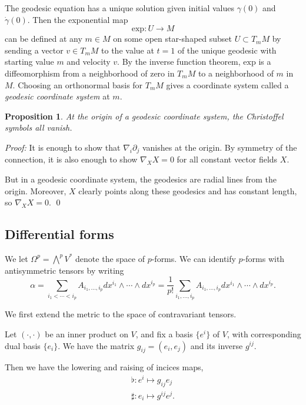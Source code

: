 \documentclass[12pt, reqno]{extarticle}
\theoremstyle{plain}
\newtheorem{proposition}{Proposition}[section]
\theoremstyle{definition}
\theoremstyle{remark}
\begin{document}
The geodesic equation has a unique solution given initial values $\gamma(0)$ and $\dot{\gamma}(0)$.
Then the exponential map 
\[
    \text{exp}: U \to M
\]
can be defined at any $m \in M$ on some open star-shaped subset $U \subset T_m M$ by 
sending a vector $v \in T_m M$ to the value at $t = 1$ of the unique geodesic 
with starting value $m$ and velocity $v$. By the inverse function theorem, $\text{exp}$
is a diffeomorphism from a neighborhood of zero in $T_m M$ to a neighborhood of $m$ in $M$.
Choosing an orthonormal basis for $T_m M$ gives a coordinate system called
a \textit{geodesic coordinate system} at $m$. 

\begin{proposition}
    At the origin of a geodesic coordinate system, the Christoffel symbols all vanish.
\end{proposition}

\textit{Proof:} It is enough to show that $\nabla_i \partial_j$ vanishes at the origin. 
By symmetry of the connection, it is also enough to show $\nabla_X X = 0$ for
all constant vector fields $X$.

But in a geodesic coordinate system, the geodesics are radial lines from the origin. Moreover,
$X$ clearly points along these geodesics and has constant length, so $\nabla_X X = 0$. \qed

\subsection{Differential forms}

We let $\Omega^p = \bigwedge^p V^*$ denote the space of $p$-forms. We can identify 
$p$-forms with antisymmetric tensors by writing 
\[
    \alpha = \sum_{i_1 < \cdots < i_p} A_{i_1, \dots, i_p} dx^{i_1}\wedge \cdots \wedge dx^{i_p}
    = \frac{1}{p!}\sum_{i_1,\dots, i_p} A_{i_1,\dots, i_p} dx^{i_1}\wedge \cdots \wedge dx^{i_p}.
\]

We first extend the metric to the space of contravariant tensors. 

Let $(\cdot, \cdot)$ be an inner product on $V$, and fix a basis $\{e^i\}$
of $V$, with corresponding dual basis $\{e_i\}$. We have the matrix $g_{ij} = (e_i, e_j)$
and its inverse $g^{ij}$.

Then we have the lowering and raising of incices maps, 
\begin{align*}
    \flat: e^i \mapsto g_{ij}e_j\\
    \sharp: e_i \mapsto g^{ij}e^j.
\end{align*}
\end{document}
